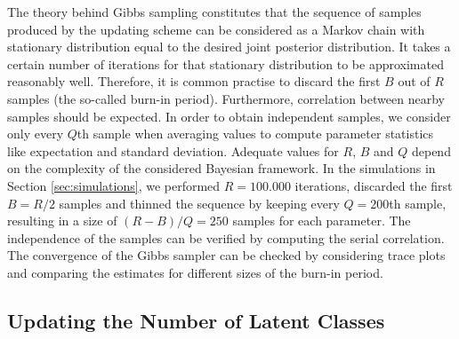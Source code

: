 \documentclass[article]{jss}
\begin{document}
The theory behind Gibbs sampling constitutes that the sequence of samples produced by the updating scheme can be considered as a Markov chain with stationary distribution equal to the desired joint posterior distribution. It takes a certain number of iterations for that stationary distribution to be approximated reasonably well. Therefore, it is common practise to discard the first $B$ out of $R$ samples (the so-called burn-in period). Furthermore, correlation between nearby samples should be expected. In order to obtain independent samples, we consider only every $Q$th sample when averaging values to compute parameter statistics like expectation and standard deviation. Adequate values for $R$, $B$ and $Q$ depend on the complexity of the considered Bayesian framework. In the simulations in Section \ref{sec:simulations}, we performed $R=100.000$ iterations, discarded the first $B=R/2$ samples and thinned the sequence by keeping every $Q=200$th sample, resulting in a size of $(R-B)/Q=250$ samples for each parameter. The independence of the samples can be verified by computing the serial correlation. The convergence of the Gibbs sampler can be checked by considering trace plots and comparing the estimates for different sizes of the burn-in period.

\subsection{Updating the Number of Latent Classes} \label{subsec:classes}
\end{document}
